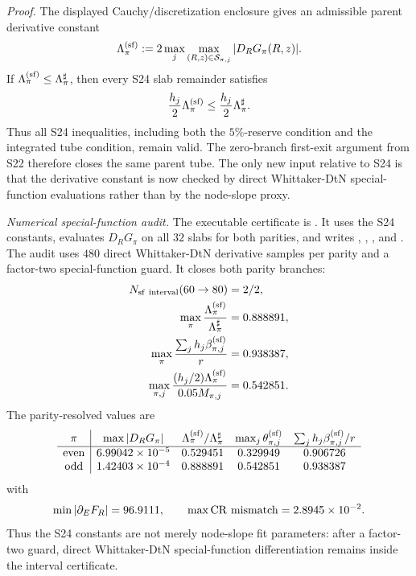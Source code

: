 \documentclass[aps,prd,onecolumn,notitlepage,nofootinbib,superscriptaddress,11pt,floatfix]{revtex4-2}
\begin{document}
\emph{Proof.}
The displayed Cauchy/discretization enclosure gives an admissible parent
derivative constant
\[
\Lambda_\pi^{\rm(sf)}
:=
2\max_{j}\max_{(R,z)\in{\cal S}_{\pi,j}}|D_RG_\pi(R,z)|.
\]
If \(\Lambda_\pi^{\rm(sf)}\le\Lambda_\pi^\sharp\), then every S24 slab
remainder satisfies
\[
\frac{h_j}{2}\Lambda_\pi^{\rm(sf)}
\le
\frac{h_j}{2}\Lambda_\pi^\sharp .
\]
Thus all S24 inequalities, including both the \(5\%\)-reserve condition and
the integrated tube condition, remain valid.  The zero-branch first-exit
argument from S22 therefore closes the same parent tube.  The only new input
relative to S24 is that the derivative constant is now checked by direct
Whittaker-DtN special-function evaluations rather than by the node-slope proxy.

\emph{Numerical special-function audit.}
The executable certificate is
.  It
uses the S24 constants, evaluates \(D_RG_\pi\) on all \(32\) slabs for both
parities, and writes
,
,
, and
.
The audit uses \(480\) direct Whittaker-DtN derivative samples per parity and a
factor-two special-function guard.  It closes both parity branches:
\[
\begin{aligned}
N_{\rm sf\ interval}(60\to80)&=2/2,\\
\max_\pi\frac{\Lambda_\pi^{\rm(sf)}}{\Lambda_\pi^\sharp}&=0.888891,\\
\max_\pi\frac{\sum_jh_j\beta_{\pi,j}^{\rm(sf)}}{r}&=0.938387,\\
\max_{\pi,j}\frac{(h_j/2)\Lambda_\pi^{\rm(sf)}}{0.05M_{\pi,j}}&=0.542851.
\end{aligned}
\]
The parity-resolved values are
\[
\begin{array}{c|cccc}
\pi & \max|D_RG_\pi| & \Lambda_\pi^{\rm(sf)}/\Lambda_\pi^\sharp &
\max_j\theta_{\pi,j}^{\rm(sf)} &
\sum_jh_j\beta_{\pi,j}^{\rm(sf)}/r\\
\hline
{\rm even} & 6.99042\times10^{-5} & 0.529451 & 0.329949 & 0.906726\\
{\rm odd}  & 1.42403\times10^{-4} & 0.888891 & 0.542851 & 0.938387
\end{array}
\]
with
\[
\min|\partial_EF_R|=96.9111,\qquad
\max{\rm CR\ mismatch}=2.8945\times10^{-2}.
\]
Thus the S24 constants are not merely node-slope fit parameters: after a
factor-two guard, direct Whittaker-DtN special-function differentiation remains
inside the interval certificate.
\end{document}
